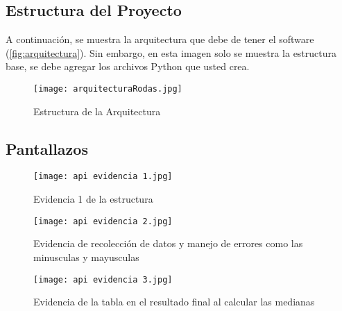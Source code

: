 \documentclass[12pt]{article}
\begin{document}
\newpage
\subsection{Estructura del Proyecto}

A continuación, se muestra la arquitectura que debe de tener el software (\autoref{fig:arquitectura}). Sin embargo, en esta imagen solo se muestra la estructura base, se debe agregar los archivos Python que usted crea.


\begin{figure}[h!]
    \centering
    \texttt{[image: arquitecturaRodas.jpg]}
    \caption{Estructura de la Arquitectura}
    \label{fig:arquitectura}
\end{figure}


\subsection{Pantallazos}

\begin{figure}[h]  
    \centering
    \texttt{[image: api evidencia 1.jpg]}  %
    \caption{Evidencia 1 de la estructura}
    \label{fig:mi_imagen}
\end{figure}

\begin{figure}[h!]  
    \centering
    \texttt{[image: api evidencia 2.jpg]}  %
    \caption{Evidencia de recolección de datos y manejo de errores como las minusculas y mayusculas}
    \label{fig:mi_imagen}
\end{figure}

\begin{figure}[t!]  
    \centering
    \texttt{[image: api evidencia 3.jpg]}  %
    \caption{Evidencia de la tabla en el resultado final al calcular las medianas}
    \label{fig:mi_imagen}
\end{figure}
\end{document}
